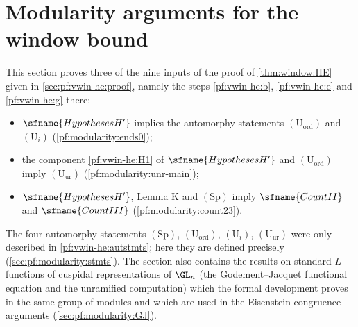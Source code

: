 \section{Modularity arguments for the window bound}\label{sec:pf:modularity}

\providecommand{\modularitycyc}{\chi_{\mathrm{cyc}}}
\providecommand{\modularityG}{\mathcal G}
\providecommand{\modularityQZ}{\Q_\ell/\Z_\ell}
\providecommand{\modularitySha}{\mathrm{sha}}
\providecommand{\modularitycot}{\lambda^{\mathrm{cot}}}

This section proves three of the nine inputs of the proof of \cref{thm:window:HE} given in
\cref{sec:pf:vwin-he:proof}, namely the steps \ref{pf:vwin-he:b}, \ref{pf:vwin-he:e} and \ref{pf:vwin-he:g} there:
\begin{itemize}
\item $\sfname{HypothesesH'}$ implies the automorphy statements $(\mathrm{U}_{\mathrm{ord}})$ and $(\mathrm{U}_i)$
(\cref{pf:modularity:ends0});
\item the component \ref{pf:vwin-he:H1} of $\sfname{HypothesesH'}$ and $(\mathrm{U}_{\mathrm{ord}})$ imply
$(\mathrm{U}_{\mathrm{ur}})$ (\cref{pf:modularity:unr-main});
\item $\sfname{HypothesesH'}$, Lemma K and $(\mathrm{Sp})$ imply $\sfname{CountII}$ and $\sfname{CountIII}$
(\cref{pf:modularity:count23}).
\end{itemize}
The four automorphy statements $(\mathrm{Sp})$, $(\mathrm{U}_{\mathrm{ord}})$, $(\mathrm{U}_i)$, $(\mathrm{U}_{\mathrm{ur}})$
were only described in \cref{pf:vwin-he:autstmts}; here they are defined precisely
(\cref{sec:pf:modularity:stmts}). The section also contains the results on standard $L$-functions of cuspidal
representations of $\GL_n$ (the Godement--Jacquet functional equation and the unramified computation) which the
formal development proves in the same group of modules and which are used in the Eisenstein congruence arguments
(\cref{sec:pf:modularity:GJ}).

